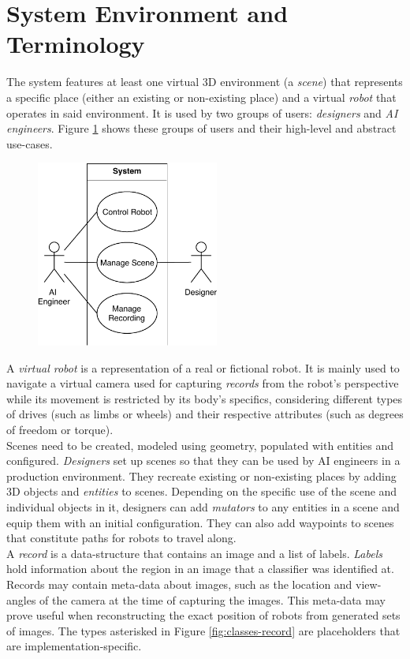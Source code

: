 \section{System Environment and Terminology}
The system features at least one virtual 3D environment (a \emph{scene}) that represents a specific place (either an existing or non-existing place) and a virtual \emph{robot} that operates in said environment. It is used by two groups of users: \emph{designers} and \emph{\ac{AI} engineers}. Figure \ref{fig:use-cases-abstract} shows these groups of users and their high-level and abstract use-cases.
\begin{figure}[t]
    \centering
    \includegraphics[width=6cm]{img/ch04/UseCases_HighLevel.pdf}
    \label{fig:use-cases-abstract}
\end{figure}
A \emph{virtual robot} is a representation of a real or fictional robot. It is mainly used to navigate a virtual camera used for capturing \emph{records} from the robot's perspective while its movement is restricted by its body's specifics, considering different types of drives (such as limbs or wheels) and their respective attributes (such as degrees of freedom or torque).\\
Scenes need to be created, modeled using geometry, populated with entities and configured. \emph{Designers} set up scenes so that they can be used by \acs{AI} engineers in a production environment. They recreate existing or non-existing places by adding 3D objects and \emph{entities} to scenes. Depending on the specific use of the scene and individual objects in it, designers can add \emph{mutators} to any entities in a scene and equip them with an initial configuration. They can also add waypoints to scenes that constitute paths for robots to travel along.\\
A \emph{record} is a data-structure that contains an image and a list of labels. \emph{Labels} hold information about the region in an image that a classifier was identified at. Records may contain meta-data about images, such as the location and view-angles of the camera at the time of capturing the images. This meta-data may prove useful when reconstructing the exact position of robots from generated sets of images. The types asterisked in Figure \ref{fig:classes-record} are placeholders that are implementation-specific.

